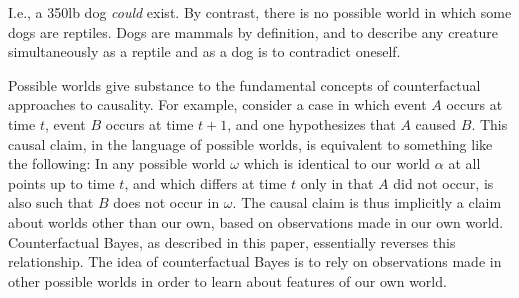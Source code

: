 \documentclass[twocolumn,10pt]{asme2ej}
\begin{document}
%
I.e., a 350lb dog \textit{could} exist.
%
%
By contrast, there is no possible world in which some dogs are reptiles. 
%
Dogs are mammals by definition, and to describe any creature simultaneously as a reptile and as a dog is to contradict oneself. 
%
% 
%
%

%
Possible worlds give substance to the fundamental concepts of counterfactual approaches to causality.
%
For example, consider a case in which event $A$ occurs at time $t$, event $B$ occurs at time $t+1$, and one hypothesizes that $A$ caused $B$.
%
This causal claim, in the language of possible worlds, is equivalent to something like the following: In any possible world $\omega$ which is identical to our world $\alpha$ at all points up to time $t$, and which differs at time $t$ only in that $A$ did not occur, is also such that $B$ does not occur in $\omega$.
%
The causal claim is thus implicitly a claim about worlds other than our own, based on observations made in our own world.
%
Counterfactual Bayes, as described in this paper, essentially reverses this relationship.
%
The idea of counterfactual Bayes is to rely on observations made in other possible worlds in order to learn about features of our own world.
%
\end{document}
